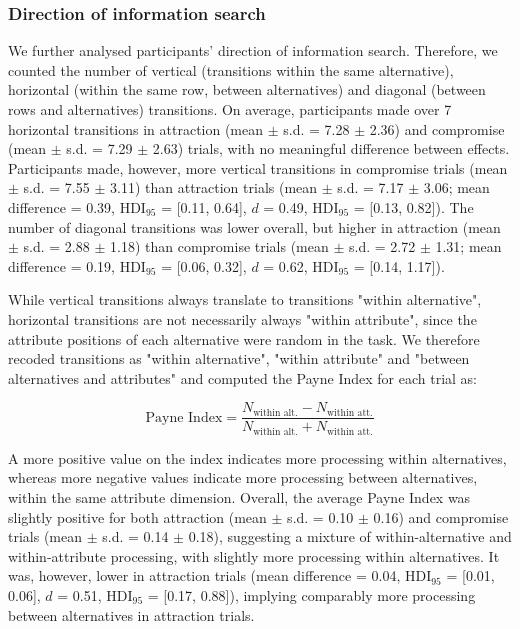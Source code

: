 \documentclass[11pt, a4paper]{article}
\begin{document}
\subsubsection*{Direction of information search}
We further analysed participants’ direction of information search. Therefore, we counted the number of vertical (transitions within the same alternative), horizontal (within the same row, between alternatives) and diagonal (between rows and alternatives) transitions. On average, participants made over 7 horizontal transitions in attraction (mean $\pm$ s.d. = 7.28 $\pm$ 2.36) and compromise (mean $\pm$ s.d. = 7.29 $\pm$ 2.63) trials, with no meaningful difference between effects. Participants made, however, more vertical transitions in compromise trials (mean $\pm$ s.d. = 7.55 $\pm$ 3.11) than attraction trials (mean $\pm$ s.d. = 7.17 $\pm$ 3.06; mean difference = 0.39, HDI$_{95}$  = [0.11, 0.64], $d$ = 0.49, HDI$_{95}$  = [0.13, 0.82]). The number of diagonal transitions was lower overall, but higher in attraction (mean $\pm$ s.d. = 2.88 $\pm$ 1.18) than compromise trials (mean $\pm$ s.d. = 2.72 $\pm$ 1.31; mean difference = 0.19, HDI$_{95}$  = [0.06, 0.32], $d$ = 0.62, HDI$_{95}$  = [0.14, 1.17]).

While vertical transitions always translate to transitions "within alternative", horizontal transitions are not necessarily always "within attribute", since the attribute positions of each alternative were random in the task. We therefore recoded transitions as "within alternative", "within attribute" and "between alternatives and attributes" and computed the Payne Index \parencite{payne1976TaskComplexityContingent} for each trial as:

\begin{equation}
    \text{Payne Index} = \frac{N_{\text{within~alt.}} - N_{\text{within~att.}}}{N_{\text{within~alt.}} + N_{\text{within~att.}}}
\end{equation}

A more positive value on the index indicates more processing within alternatives, whereas more negative values indicate more processing between alternatives, within the same attribute dimension. Overall, the average Payne Index was slightly positive for both attraction (mean $\pm$ s.d. = 0.10 $\pm$ 0.16) and compromise trials (mean $\pm$ s.d. = 0.14 $\pm$ 0.18), suggesting a mixture of within-alternative and within-attribute processing, with slightly more processing within alternatives. It was, however, lower in attraction trials (mean difference = 0.04, HDI$_{95}$  = [0.01, 0.06], $d$ = 0.51, HDI$_{95}$  = [0.17, 0.88]), implying comparably more processing between alternatives in attraction trials.
\clearpage
\end{document}
